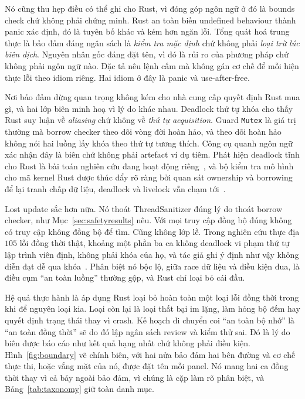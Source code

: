 Nó cũng
thu hẹp điều có thể ghi cho Rust, vì đóng góp ngôn ngữ ở đó là bounds
check chứ không phải chứng minh. Rust an toàn biến undefined behaviour thành panic xác định, đó là
tuyên bố khác và kém hơn ngăn lỗi. Tổng quát hoá trung thực là
bảo đảm đáng ngân sách là \emph{kiểm tra mặc định} chứ không phải \emph{loại trừ lúc
biên dịch}. Nguyên nhân gốc đáng đặt tên, vì đó là rủi ro của phương pháp
chứ không phải ngôn ngữ nào. Đặc tả nêu lệnh cấm mà không gán
cơ chế để mỗi hiện thực lỗi theo idiom riêng. Hai idiom ở đây là
panic và use-after-free.

Nơi bảo đảm dừng quan trọng không kém cho nhà cung cấp quyết định Rust mua gì, và hai
lớp biên minh hoạ vì lý do khác nhau. Deadlock thứ tự khóa cho thấy Rust
suy luận về \emph{aliasing} chứ không về \emph{thứ tự acquisition}. Guard \texttt{Mutex} là
giá trị thường mà borrow checker theo dõi vòng đời hoàn hảo, và theo dõi hoàn hảo
không nói hai luồng lấy khóa theo thứ tự tương thích. Công cụ quanh ngôn ngữ xác nhận đây là biên chứ không phải artefact ví dụ tiêm.
Phát hiện deadlock tĩnh cho Rust là bài toán nghiên cứu đang hoạt động
riêng~\cite{zhang2026deadlock}, và bộ kiểm tra mô hình cho mã kernel Rust được thúc đẩy
rõ ràng bởi quan sát ownership và borrowing để lại tranh chấp dữ liệu, deadlock và
livelock vẫn chạm tới~\cite{tang2025converos}.

Lost update sắc hơn nữa. Nó thoát
ThreadSanitizer đúng lý do thoát borrow checker, như
Mục~\ref{sec:safetyresults} nêu. Với mọi truy cập đồng bộ đúng không có
truy cập không đồng bộ để tìm. Cũng không lớp lề. Trong nghiên cứu thực địa $105$
lỗi đồng thời thật, khoảng một phần ba ca không deadlock vi phạm thứ tự lập trình viên
định, không phải khóa của họ, và tác giả ghi ý định như vậy không diễn đạt
dễ qua khóa~\cite{lu2008mistakes}. Phân biệt
nó bộc lộ, giữa race dữ liệu và điều kiện đua, là điều cụm ``an toàn luồng'' thường gộp, và Rust chỉ loại bỏ
cái đầu.

Hệ quả thực hành là áp dụng Rust loại bỏ hoàn toàn một loại lỗi đồng thời
trong khi để nguyên loại kia. Loại còn lại là loại thất bại
im lặng, làm hỏng bộ đếm hay quyết định trạng thái thay vì crash. Kế hoạch di chuyển
coi ``an toàn bộ nhớ'' là ``an toàn đồng thời'' sẽ do đó lập ngân sách review và kiểm thử
sai. Đó là lý do biên được báo cáo như kết quả hạng nhất chứ không phải điều kiện.
Hình~\ref{fig:boundary} vẽ chính biên, với hai nửa
bảo đảm hai bên đường và cơ chế thực thi, hoặc vắng mặt
của nó, được đặt tên mỗi panel. Nó mang hai ca đồng thời thay vì cả bảy ngoài
bảo đảm, vì chúng là cặp làm rõ phân biệt, và
Bảng~\ref{tab:taxonomy} giữ toàn danh mục.

